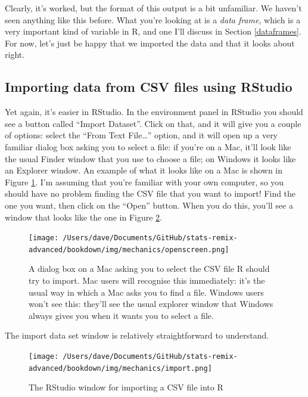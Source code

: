 \documentclass[
]{book}
\begin{document}
Clearly, it's worked, but the format of this output is a bit unfamiliar. We haven't seen anything like this before. What you're looking at is a \emph{data frame}, which is a very important kind of variable in R, and one I'll discuss in Section \ref{dataframes}. For now, let's just be happy that we imported the data and that it looks about right.

\hypertarget{importing-data-from-csv-files-using-rstudio}{%
\subsection{Importing data from CSV files using RStudio}\label{importing-data-from-csv-files-using-rstudio}}

Yet again, it's easier in RStudio. In the environment panel in RStudio you should see a button called ``Import Dataset''. Click on that, and it will give you a couple of options: select the ``From Text File\ldots{}'' option, and it will open up a very familiar dialog box asking you to select a file: if you're on a Mac, it'll look like the usual Finder window that you use to choose a file; on Windows it looks like an Explorer window. An example of what it looks like on a Mac is shown in Figure \ref{fig:fileopen}. I'm assuming that you're familiar with your own computer, so you should have no problem finding the CSV file that you want to import! Find the one you want, then click on the ``Open'' button. When you do this, you'll see a window that looks like the one in Figure \ref{fig:import}.

\begin{figure}
\centering
\texttt{[image: /Users/dave/Documents/GitHub/stats-remix-advanced/bookdown/img/mechanics/openscreen.png]}
\caption{\label{fig:fileopen}A dialog box on a Mac asking you to select the CSV file R should try to import. Mac users will recognise this immediately: it's the usual way in which a Mac asks you to find a file. Windows users won't see this: they'll see the usual explorer window that Windows always gives you when it wants you to select a file.}
\end{figure}

The import data set window is relatively straightforward to understand.

\begin{figure}
\centering
\texttt{[image: /Users/dave/Documents/GitHub/stats-remix-advanced/bookdown/img/mechanics/import.png]}
\caption{\label{fig:import}The RStudio window for importing a CSV file into R}
\end{figure}
\end{document}
